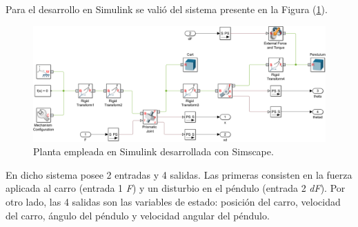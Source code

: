 Para el desarrollo en Simulink se valió del sistema presente en la Figura (\ref{fig:planta_simscape}).

\begin{figure}[H]
	\centering
	\includegraphics[width=0.9\linewidth]{ImagenesDiseño de Planta/planta_simscape}
	\caption{Planta empleada en Simulink desarrollada con Simscape.}	
	\label{fig:planta_simscape}
\end{figure}

En dicho sistema posee 2 entradas y 4 salidas. Las primeras consisten en la fuerza aplicada al carro (entrada 1 \textit{F}) y un disturbio en el péndulo (entrada 2 \textit{dF}). Por otro lado, las 4 salidas son las variables de estado: posición del carro, velocidad del carro, ángulo del péndulo y velocidad angular del péndulo.

%